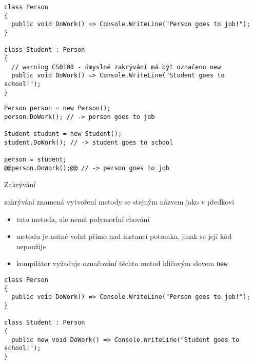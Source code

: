 \begin{frame}[fragile]
\begin{noblock}
\begin{lstlisting}[basicstyle=\small]
class Person
{
  public void DoWork() => Console.WriteLine("Person goes to job!");
}

class Student : Person
{
  // warning CS0108 - úmyslné zakrývání má být označeno new
  public void DoWork() => Console.WriteLine("Student goes to school!");
}
\end{lstlisting}
\end{noblock}
\vfill
\begin{yesblock}
\begin{lstlisting}[basicstyle=\small]
Person person = new Person();
person.DoWork(); // -> person goes to job

Student student = new Student();
student.DoWork(); // -> student goes to school

person = student;
@@person.DoWork();@@ // -> person goes to job 
\end{lstlisting}
\end{yesblock}
\end{frame}



\begin{frame}[fragile]
\begin{bitemize}{Zakrývání}
\item zakrývání znamená vytvoření metody se stejným názvem jako v předkovi
\begin{itemize}
\item tato metoda, ale nemá polymorfní chování
\item metodu je nutné volat přímo nad instancí potomka, jinak se její kód nepoužije
\item kompilátor vyžaduje označování těchto metod klíčovým slovem \lstinline|new|
\end{itemize}
\end{bitemize}
\vfill
\begin{yesblock}
\begin{lstlisting}[basicstyle=\small]
class Person
{
  public void DoWork() => Console.WriteLine("Person goes to job!");
}

class Student : Person
{
  public new void DoWork() => Console.WriteLine("Student goes to school!");
}
\end{lstlisting}
\end{yesblock}
\end{frame}



